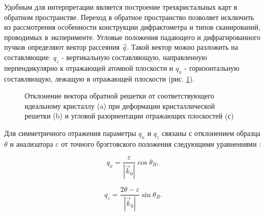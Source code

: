 Удобным для интерпретации является построение трехкристальных карт в обратном пространстве.
Переход в обратное пространство позволяет исключить из рассмотрения особенности
конструкции дифрактометра и типов сканирований, проводимых в эксперименте.
 Угловые положения падающего и дифрагированного пучков
определяют вектор рассеяния $\vec{q}$. Такой вектор можно разложить на составляющие:
$q_z$ - вертикальную составляющую,
направленную перпендикулярно к отражающей атомной плоскости и $q_x$ - горизонтальную составляющую,
лежащую в отражающей плоскости (рис. \ref{ris:q_vector_reciprocal_space}).

\begin{figure}[H]
  \centering
  \hfill
  \hfill
  \caption{Отклонение вектора обратной решетки от соответствующего идеальному кристаллу (a)
  при деформации кристаллической решетки (b) и угловой разориентации отражающих плоскостей (с) }
  \label{ris:q_vector_reciprocal_space}
\end{figure}

Для симметричного отражения параметры $q_x$ и $q_z$ связаны с отклонением образца $\theta$ и
анализатора $\varepsilon$ от точного брэгговского положения следующими
уравнениями \cite{tanner_1998}:

\begin{equation}
  q_x = \frac{\varepsilon}{|\vec{k}_0|} \cos \theta_B,
  \label{eq:qx_eqn}
\end{equation}

\begin{equation}
  q_z = \frac{2\theta - \varepsilon}{|\vec{k}_0|} \sin \theta_B.
  \label{eq:qz_eqn}
\end{equation}

